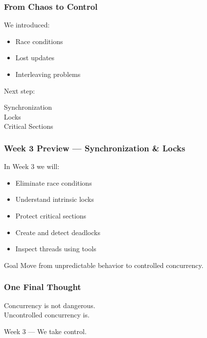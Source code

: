 \documentclass[aspectratio=169,11pt]{beamer}
\begin{document}
	\begin{frame}
		\frametitle{From Chaos to Control}
		
		We introduced:
		
		\begin{itemize}
			\item Race conditions
			\item Lost updates
			\item Interleaving problems
		\end{itemize}
		
		\vspace{6mm}
		
		Next step:
		
		\begin{center}
			\Large
			Synchronization \\
			Locks \\
			Critical Sections
		\end{center}
		
	\end{frame}
	\begin{frame}
		\frametitle{Week 3 Preview --- Synchronization \& Locks}
		
		In Week 3 we will:
		
		\begin{itemize}
			\item Eliminate race conditions
			\item Understand intrinsic locks
			\item Protect critical sections
			\item Create and detect deadlocks
			\item Inspect threads using tools
		\end{itemize}
		
		\vspace{6mm}
		
		\begin{block}{Goal}
			Move from unpredictable behavior to controlled concurrency.
		\end{block}
		
	\end{frame}
	\begin{frame}
		\frametitle{One Final Thought}
		
		\begin{center}
			\Large
			Concurrency is not dangerous. \\
			Uncontrolled concurrency is.
		\end{center}
		
		\vspace{8mm}
		
		\begin{center}
			Week 3 --- We take control.
		\end{center}
		
	\end{frame}
	
\end{document}
